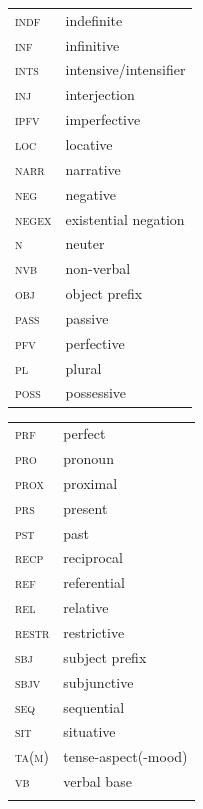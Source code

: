 \documentclass[output=paper,colorlinks=true, citecolor=brown,draftmode]{langscibook}
\begin{document}
\begin{tabularx}{.45\textwidth}{lQ}
\scshape indf & indefinite \\
\scshape inf & infinitive \\
\scshape ints & intensive/intensifier \\
\scshape inj & interjection \\
\scshape ipfv & imperfective \\
\scshape loc & locative \\
\scshape narr & narrative \\
\scshape neg & negative \\
\scshape negex & existential negation \\ 
\scshape n & neuter \\
\scshape nvb & non-verbal \\
\scshape obj & object prefix \\
\scshape pass & passive \\
\scshape pfv & perfective \\
\scshape pl & plural \\
\scshape poss & possessive\\
\end{tabularx}
\begin{tabularx}{.45\textwidth}{lQ}
\scshape prf & perfect \\
\scshape pro & pronoun \\
\scshape prox & proximal \\ 
\scshape prs & present \\
\scshape pst & past \\
\scshape recp & reciprocal \\
\scshape ref & referential \\ 
\scshape rel & relative \\
\scshape restr & restrictive \\
\scshape sbj & subject prefix \\
\scshape sbjv & subjunctive \\
\scshape seq & sequential  \\
\scshape sit & situative \\
\scshape ta(m) & tense-aspect(-mood)\\
\scshape vb & verbal base \\
\\
\end{tabularx}


\sloppy\printbibliography[heading=subbibliography,notkeyword=this]
\end{document}
